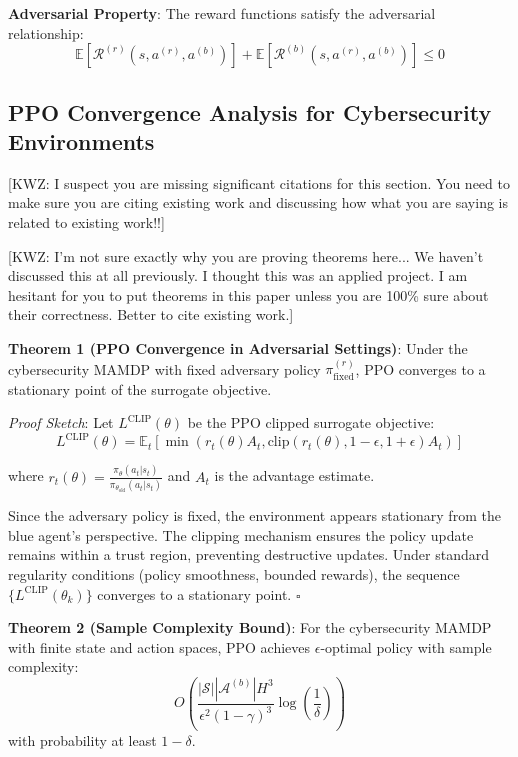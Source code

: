 \documentclass[12pt,oneside]{article}
\newcommand{\kwz}[1]{
  {\color{magenta} [KWZ: {#1}]}
 }
\begin{document}
\textbf{Adversarial Property}: The reward functions satisfy the adversarial relationship:
\begin{equation}
\mathbb{E}[\mathcal{R}^{(r)}(s,a^{(r)},a^{(b)})] + \mathbb{E}[\mathcal{R}^{(b)}(s,a^{(r)},a^{(b)})] \leq 0
\end{equation}

\subsection{PPO Convergence Analysis for Cybersecurity Environments}

\kwz{I suspect you are missing significant citations for this section. You need to make sure you are citing existing work and discussing how what you are saying is related to existing work!!}

\kwz{I'm not sure exactly why you are proving theorems here... We haven't discussed this at all previously. I thought this was an applied project. I am hesitant for you to put theorems in this paper unless you are 100\% sure about their correctness. Better to cite existing work.}

\textbf{Theorem 1 (PPO Convergence in Adversarial Settings)}: Under the cybersecurity MAMDP with fixed adversary policy $\pi^{(r)}_{\text{fixed}}$, PPO converges to a stationary point of the surrogate objective.

\textit{Proof Sketch}: 
Let $L^{\text{CLIP}}(\theta)$ be the PPO clipped surrogate objective:
\begin{equation}
L^{\text{CLIP}}(\theta) = \mathbb{E}_t \left[ \min\left( r_t(\theta) A_t, \text{clip}(r_t(\theta), 1-\epsilon, 1+\epsilon) A_t \right) \right]
\end{equation}

where $r_t(\theta) = \frac{\pi_\theta(a_t|s_t)}{\pi_{\theta_{\text{old}}}(a_t|s_t)}$ and $A_t$ is the advantage estimate.

Since the adversary policy is fixed, the environment appears stationary from the blue agent's perspective. The clipping mechanism ensures the policy update remains within a trust region, preventing destructive updates. Under standard regularity conditions (policy smoothness, bounded rewards), the sequence $\{L^{\text{CLIP}}(\theta_k)\}$ converges to a stationary point. $\square$

\textbf{Theorem 2 (Sample Complexity Bound)}: For the cybersecurity MAMDP with finite state and action spaces, PPO achieves $\epsilon$-optimal policy with sample complexity:
\begin{equation}
O\left( \frac{|\mathcal{S}||\mathcal{A}^{(b)}| H^3}{\epsilon^2 (1-\gamma)^3} \log\left(\frac{1}{\delta}\right) \right)
\end{equation}
with probability at least $1-\delta$.
\end{document}
